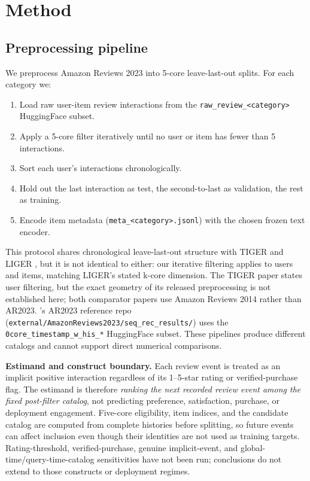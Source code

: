 \section{Method}\label{sec:3}

\subsection{Preprocessing pipeline}\label{sec:3.1}

We preprocess Amazon Reviews 2023 \citep{hou2024blair} into 5-core leave-last-out splits. For each category we:

\begin{enumerate}
\def\labelenumi{\arabic{enumi}.}
\tightlist
\item
  Load raw user-item review interactions from the \texttt{raw\_review\_\textless{}category\textgreater{}} HuggingFace subset.
\item
  Apply a 5-core filter iteratively until no user or item has fewer than 5 interactions.
\item
  Sort each user's interactions chronologically.
\item
  Hold out the last interaction as test, the second-to-last as validation, the rest as training.
\item
  Encode item metadata (\texttt{meta\_\textless{}category\textgreater{}.jsonl}) with the chosen frozen text encoder.
\end{enumerate}

This protocol shares chronological leave-last-out structure with TIGER \citep{rajput2023tiger} and LIGER \citep{yang2024liger}, but it is not identical to either: our iterative filtering applies to users and items, matching LIGER's stated k-core dimension. The TIGER paper states user filtering, but the exact geometry of its released preprocessing is not established here; both comparator papers use Amazon Reviews 2014 rather than AR2023. \citet{hou2024blair}'s AR2023 reference repo (\texttt{external/\allowbreak AmazonReviews2023/\allowbreak seq\_rec\_results/}) uses the \texttt{0core\_timestamp\_w\_his\_*} HuggingFace subset. These pipelines produce different catalogs and cannot support direct numerical comparisons.

\textbf{Estimand and construct boundary.} Each review event is treated as an implicit
positive interaction regardless of its 1--5-star rating or verified-purchase flag. The
estimand is therefore \emph{ranking the next recorded review event among the fixed
post-filter catalog}, not predicting preference, satisfaction, purchase, or deployment
engagement. Five-core eligibility, item indices, and the candidate catalog are computed
from complete histories before splitting, so future events can affect inclusion even
though their identities are not used as training targets. Rating-threshold,
verified-purchase, genuine implicit-event, and global-time/query-time-catalog
sensitivities have not been run; conclusions do not extend to those constructs or
deployment regimes.


